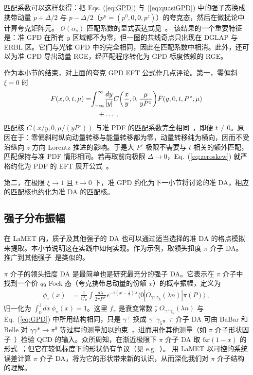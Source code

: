 匹配系数可以这样获得：把 Eqs. (\ref{eq:GPD}) 与 (\ref{eq:quasiGPD}) 中的强子态换成携带动量 $p+\Delta/2$ 与 $p-\Delta/2$（$p^\mu=(p^0,0,0,p^z)$）的夸克态，然后在微扰论中计算夸克矩阵元。
%
$\mathcal O(\alpha_s)$ 匹配系数的显式表达式见~\cite{Liu:2019urm}。
%
该结果的一个重要特征是：准 GPD 在所有 $y$ 区域都不为零，但一圈的共线奇点只出现在 DGLAP 与 ERBL 区。它们与光锥 GPD 中的完全相同，因此在匹配系数中相消。此外，还可以为准 GPD 导出动量 RGE，经匹配程序转化为 GPD 标度依赖的 RGE。


作为本小节的结束，对上面的夸克 GPD EFT 公式作几点评论。第一，零偏斜 $\xi=0$ 时
\begin{align} \label{eq:zeroskew}
	F(x,0,t,\mu)&=\!\! \int_{-\infty}^\infty\! {dy\over |y|}C\!\left({x\over y}, 0, {\mu \over y{P}^z }\right)\! {\tilde F}(y,0,t,P^z,\mu)\nonumber\\
	&\qquad +\ldots\,,
\end{align}
匹配核 $C(x/y,0,\mu/(yP^z))$ 与准 PDF 的匹配系数完全相同~\cite{Izubuchi:2018srq}，即便 $t\neq0$。原因在于：零偏斜时纵向动量转移与能量转移都为零，动量转移纯为横向，因而不受沿纵向 $z$ 方向 Lorentz 推进的影响。于是大 $P^z$ 极限不需要与 $t$ 相关的额外匹配，匹配保持与准 PDF 情形相同。若再取前向极限 $\Delta \to0$，Eq.~(\ref{eq:zeroskew}) 就严格约化为 PDF 的 EFT 展开公式~\cite{Ji:2015qla,Izubuchi:2018srq}。

第二，在极限 $\xi\to1$ 且 $t\to0$ 下，准 GPD 约化为下一小节将讨论的准 DA，相应的匹配核也约化为准 DA 的匹配核。


\subsection{强子分布振幅}
\label{sec:others-da}

在 LaMET 内，质子及其他强子的 DA 也可以通过适当选择的准 DA 的格点模拟来提取。本小节说明这在实践中如何实现。作为示例，取领头扭度 $\pi$ 介子 DA。推广到其他强子~\cite{Chen:2017gck,Wang:2019msf}是类似的。


$\pi$ 介子的领头扭度 DA 是最简单也是研究最充分的强子 DA。它表示在 $\pi$ 介子中找到一个价 $q\bar q$ Fock 态（夸克携带总动量的份额 $x$）的概率振幅，定义为
\begin{align}\label{eq:pionDA}
	\phi_{\pi}(x)&={\frac{1}{if_{\pi}}}\int \frac{d\lambda}{2\pi P^+}e^{-i (x-\frac 1 2)\lambda}\langle 0|O_{\gamma^+\gamma_5}(\lambda n)|\pi(P)\rangle\,,
\end{align}
归一化为 $\int_0^1 dx\, \phi_\pi(x)=1$。这里 $f_\pi$ 是衰变常数；$O_{\gamma^+\gamma_5}(\lambda n)$ 与 Eq.~(\ref{eq:GPD}) 中所用结构相同，只是 $\gamma^+$ 换成 $\gamma^+\gamma_5$。$\pi$ 介子 DA 可由 BaBar 和 Belle 对 $\gamma \gamma* \rightarrow \pi^0$ 等过程的测量加以约束~\cite{Aubert:2009mc,Uehara:2012ag}，进而用作其他测量（如 $\pi$ 介子形状因子~\cite{Efremov:1978rn,Farrar:1979aw}）检验 QCD 的输入。众所周知，在渐近极限下 $\pi$ 介子 DA 取 $6 x(1-x)$ 的形式~\cite{Efremov:1978rn,Lepage:1979zb}；但它在较低标度下的形状仍有争议（见 e.g.~\cite{Chernyak:1981zz}）。
%
用 LaMET 以可控的系统误差计算 $\pi$ 介子 DA，将为它的形状带来新的认识，从而深化我们对 $\pi$ 介子结构的理解。


